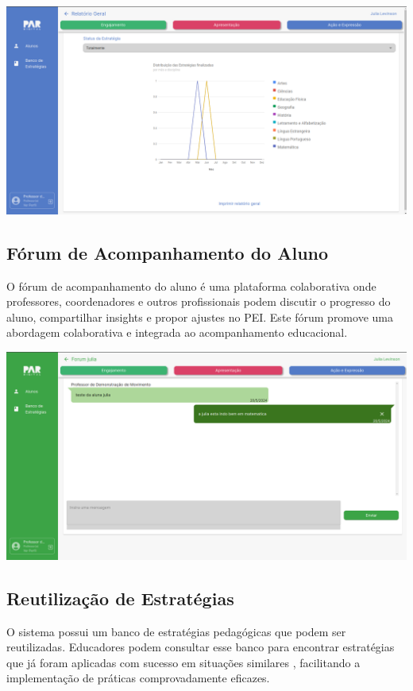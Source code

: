 \documentclass[sigconf]{webmedia}
\begin{document}
\includegraphics[scale=0.12]{./imgs/relatorio}


\subsection{Fórum de Acompanhamento do Aluno}
O fórum de acompanhamento do aluno é uma plataforma colaborativa onde 
professores, coordenadores e outros profissionais podem discutir o 
progresso do aluno, compartilhar insights e propor ajustes no PEI. 
Este fórum promove uma abordagem colaborativa e integrada ao 
acompanhamento educacional.
\vspace{0.5cm}

\includegraphics[scale=0.12]{./imgs/forum}

\subsection{Reutilização de Estratégias}
O sistema possui um banco de estratégias pedagógicas que podem ser 
reutilizadas. Educadores podem consultar esse banco para encontrar 
estratégias que já foram aplicadas com sucesso em situações similares
, facilitando a implementação de práticas comprovadamente eficazes.
\vspace{0.5cm}
\end{document}
